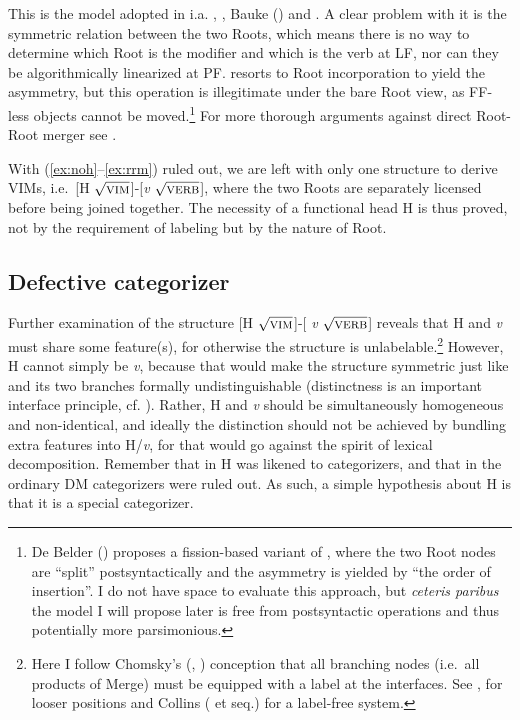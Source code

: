 \documentclass[output=paper]{langsci/langscibook}
\begin{document}
\noindent This is the  model adopted in i.a. \citet{Zhang2007},
\citet{Borer2013}, Bauke (\citeyear{Bauke2014,Bauke2016}) and
\citet{deBeldervanKoppen2016}. A clear problem with it is the symmetric
relation between the two Roots, which means there is no way to determine which
Root is the modifier and which is the verb at \gls{LF}, nor can they be
algorithmically linearized at PF. \citet{Borer2013} resorts to Root
incorporation to yield the asymmetry, but this operation is illegitimate under
the bare Root view, as FF-less objects cannot be moved.\footnote{De Belder
(\citeyear{deBelder2017}) proposes a fission-based variant of ,
where the two Root nodes are ``split'' postsyntactically and the asymmetry is
yielded by ``the order of insertion''. I do not have space to evaluate this
approach, but \emph{ceteris paribus} the model I will propose later is free
from postsyntactic operations and thus potentially more parsimonious.} For more
thorough arguments against direct Root-Root merger see \citet{Song2017roots}.

With (\ref{ex:noh}--\ref{ex:rrm}) ruled out, we are left with only one structure
to derive \glspl{VIM}, i.e.\ [H {$\sqrt{\textrm{\textsc{vim}}}$}]-[{\em v}
{$\sqrt{\textrm{\textsc{verb}}}$}], where the two Roots are separately licensed
before being joined together. The necessity of a functional head H is thus
proved, not by the requirement of labeling but by the nature of Root.

\subsection{Defective categorizer}\label{sec4.2}

Further examination of the structure [H {$\sqrt{\textrm{\textsc{vim}}}$}]-[{\em
v} {$\sqrt{\textrm{\textsc{verb}}}$}] reveals that H and {\em v} must share
some feature(s), for otherwise the structure is unlabelable.\footnote{Here I
follow Chomsky's (\citeyear{Chomsky2013}, \citeyear{Chomsky2015}) conception
that all branching nodes (i.e.\ all products of Merge) must be equipped with a
label at the interfaces. See \citet{Boskovic2016tlr}, \citet{BaukeRoeper2017} for
looser positions and Collins (\citeyear{Collins2002} et seq.) for a label-free
system.} However, H cannot simply be {\em v}, because that would make the
structure symmetric just like  and its two branches formally
undistinguishable (distinctness is an important interface principle, cf.
\citealt{Richards2010}). Rather, H and {\em v} should be simultaneously
homogeneous and non-identical, and ideally the distinction should not be
achieved by bundling extra features into H/{\em v}, for that would go against
the spirit of lexical decomposition. Remember that in  H was likened
to categorizers, and that in  the ordinary \gls{DM} categorizers were
ruled out. As such, a simple hypothesis about H is that it is a special
categorizer.
\end{document}

